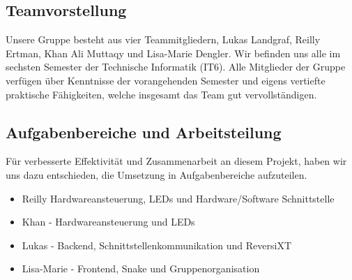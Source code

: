 \documentclass[12pt,a4paper]{article}
\begin{document}
\subsection{Teamvorstellung}
Unsere Gruppe besteht aus vier Teammitgliedern, Lukas Landgraf, Reilly Ertman, Khan Ali Muttaqy und Lisa-Marie Dengler. Wir befinden uns alle im sechsten Semester der Technische Informatik (IT6). Alle Mitglieder der Gruppe verfügen über Kenntnisse der vorangehenden Semester und eigens vertiefte praktische Fähigkeiten, welche insgesamt das Team gut vervollständigen. 

\subsection{Aufgabenbereiche und Arbeitsteilung}
Für verbesserte Effektivität und Zusammenarbeit an diesem Projekt, haben wir uns dazu entschieden, die Umsetzung in Aufgabenbereiche aufzuteilen. 
\begin{itemize}
\item Reilly Hardwareansteuerung, LEDs und Hardware/Software Schnittstelle
\item Khan - Hardwareansteuerung und LEDs
\item Lukas - Backend, Schnittstellenkommunikation und ReversiXT
\item Lisa-Marie - Frontend, Snake und Gruppenorganisation 
\end{itemize}
\end{document}
